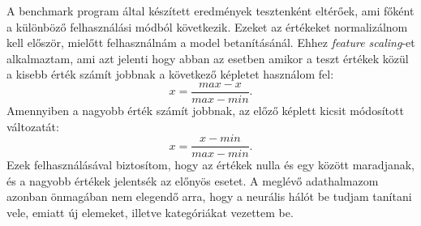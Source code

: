 A benchmark program által készített eredmények tesztenként eltérőek, ami főként a különböző felhasználási módból következik. Ezeket az értékeket normalizálnom kell először, mielőtt felhasználnám a model betanításánál. Ehhez \textit{feature scaling}-et alkalmaztam, ami azt jelenti hogy abban az esetben amikor a teszt értékek közül a kisebb érték számít jobbnak a következő képletet használom fel:
\begin{equation}
x = \frac{max-x}{max-min}.
\end{equation}
Amennyiben a nagyobb érték számít jobbnak, az előző képlett kicsit módosított változatát:
\begin{equation}
x = \frac{x-min}{max-min}.
\end{equation}
Ezek felhasználásával biztosítom, hogy az értékek nulla és egy között maradjanak, és a nagyobb értékek jelentsék az előnyös esetet.
A meglévő adathalmazom azonban önmagában nem elegendő arra, hogy a neurális hálót be tudjam tanítani vele, emiatt új elemeket, illetve kategóriákat vezettem be.
